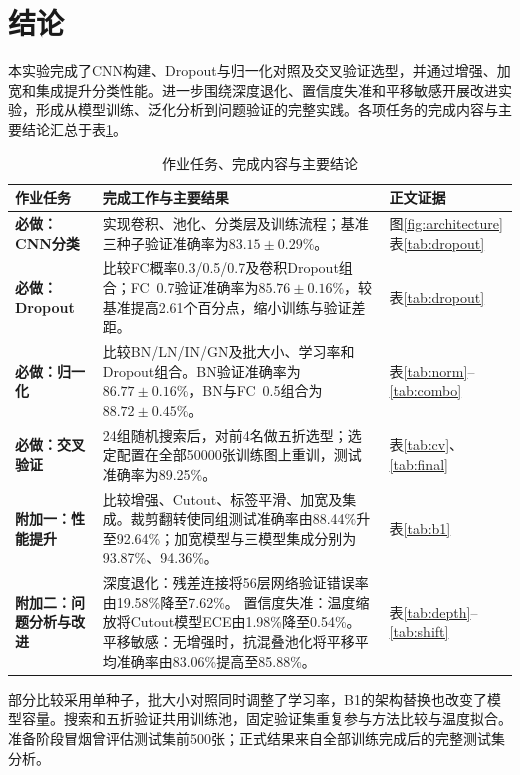 \section{结论}
本实验完成了CNN构建、Dropout与归一化对照及交叉验证选型，并通过增强、加宽和集成提升分类性能。进一步围绕深度退化、置信度失准和平移敏感开展改进实验，形成从模型训练、泛化分析到问题验证的完整实践。各项任务的完成内容与主要结论汇总于表\ref{tab:requirements}。

\begin{table}[H]\centering\small
\linespread{1.10}\selectfont
\renewcommand{\arraystretch}{1.12}
\caption{作业任务、完成内容与主要结论}\label{tab:requirements}
\begin{tabularx}{\linewidth}{@{}p{2.8cm}X p{1.8cm}@{}}
\toprule
作业任务 & 完成工作与主要结果 & 正文证据\\
\midrule
\textbf{必做：CNN分类} & 实现卷积、池化、分类层及训练流程；基准三种子验证准确率为$83.15\pm0.29\%$。 & 图\ref{fig:architecture}\newline 表\ref{tab:dropout}\\
\addlinespace[5pt]
\textbf{必做：Dropout} & 比较FC概率0.3/0.5/0.7及卷积Dropout组合；FC~0.7验证准确率为$85.76\pm0.16\%$，较基准提高2.61个百分点，缩小训练与验证差距。 & 表\ref{tab:dropout}\\
\addlinespace[5pt]
\textbf{必做：归一化} & 比较BN/LN/IN/GN及批大小、学习率和Dropout组合。BN验证准确率为$86.77\pm0.16\%$，BN与FC~0.5组合为$88.72\pm0.45\%$。 & 表\ref{tab:norm}--\ref{tab:combo}\\
\addlinespace[5pt]
\textbf{必做：交叉验证} & 24组随机搜索后，对前4名做五折选型；选定配置在全部50000张训练图上重训，测试准确率为89.25\%。 & 表\ref{tab:cv}、\ref{tab:final}\\
\midrule
\textbf{附加一：}\newline\textbf{性能提升} & 比较增强、Cutout、标签平滑、加宽及集成。裁剪翻转使同组测试准确率由88.44\%升至92.64\%；加宽模型与三模型集成分别为93.87\%、94.36\%。 & 表\ref{tab:b1}\\
\addlinespace[5pt]
\textbf{附加二：}\newline\textbf{问题分析与改进} & 深度退化：残差连接将56层网络验证错误率由19.58\%降至7.62\%。\newline
置信度失准：温度缩放将Cutout模型ECE由1.98\%降至0.54\%。\newline
平移敏感：无增强时，抗混叠池化将平移平均准确率由83.06\%提高至85.88\%。 & 表\ref{tab:depth}--\ref{tab:shift}\\
\bottomrule
\end{tabularx}
\end{table}

部分比较采用单种子，批大小对照同时调整了学习率，B1的架构替换也改变了模型容量。搜索和五折验证共用训练池，固定验证集重复参与方法比较与温度拟合。准备阶段冒烟曾评估测试集前500张；正式结果来自全部训练完成后的完整测试集分析。
